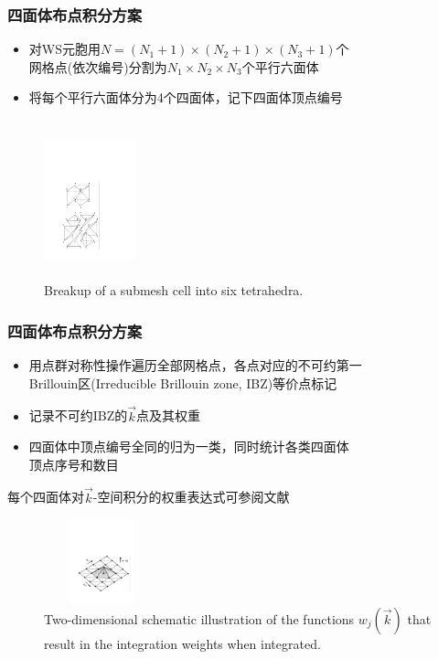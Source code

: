 \frame
{
\frametitle{四面体布点积分方案}
\begin{itemize}
\setlength{\itemsep}{5pt}
	\item 对\textrm{WS}元胞用$N=(N_1+1)\times(N_2+1)\times(N_3+1)$个\\网格点(依次编号)分割为$N_1\times N_2\times N_3$个平行六面体
	\item 将每个平行六面体分为4个四面体，记下四面体顶点编号
\end{itemize}
\begin{figure}[h!]
\centering
\hspace*{-10pt}
\vspace*{-10pt}
\includegraphics[height=1.8in,width=1.05in,viewport=120 60 360 505,clip]{Figures/submesh_Tetra.pdf}
\caption{\small \textrm{Breakup of a submesh cell into six tetrahedra.}}%
\label{Tetrahedron_split}
\end{figure}
}

\frame
{
\frametitle{四面体布点积分方案}
\begin{itemize}
\setlength{\itemsep}{10pt}
	\item 用点群对称性操作遍历全部网格点，各点对应的不可约第一\\\textrm{Brillouin}区\textrm{(Irreducible Brillouin zone, IBZ)}等价点标记
	\item 记录不可约\textrm{IBZ}的$\vec k$点及其权重
	\item 四面体中顶点编号全同的归为一类，同时统计各类四面体\\顶点序号和数目
\end{itemize}
每个四面体对$\vec k$-空间积分的权重表达式可参阅文献\cite{PRB49-16233_1994}
\begin{figure}[h!]
\centering
\includegraphics[height=0.95in,width=1.32in,viewport=85 99 560 460,clip]{Figures/dimen_Tetra.pdf}
\caption{\small \textrm{Two-dimensional schematic illustration of the functions $w_j(\vec k)$ that result in the integration weights when integrated.}}%
\label{Tetrahedron_weight}
\end{figure}
}

